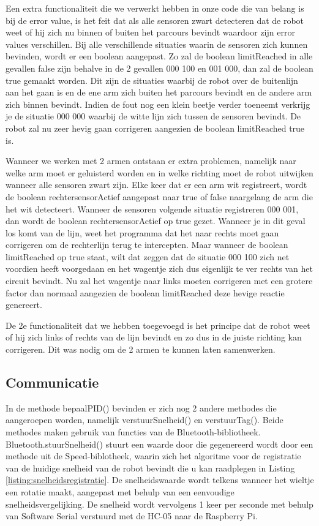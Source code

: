 Een extra functionaliteit die we verwerkt hebben in onze code die van belang is bij de error value, is het feit dat als alle sensoren zwart detecteren dat de robot weet of hij zich nu binnen of buiten het parcours bevindt waardoor zijn error values verschillen. Bij alle verschillende situaties waarin de sensoren zich kunnen bevinden, wordt er een boolean aangepast. Zo zal de boolean limitReached in alle gevallen false zijn behalve in de 2 gevallen 000 100 en 001 000, dan zal de boolean true gemaakt worden. Dit zijn de situaties waarbij de robot over de buitenlijn aan het gaan is en de ene arm zich buiten het parcours bevindt en de andere arm zich binnen bevindt. Indien de fout nog een klein beetje verder toeneemt verkrijg je de situatie 000 000 waarbij de witte lijn zich tussen de sensoren bevindt. De robot zal nu zeer hevig gaan corrigeren aangezien de boolean limitReached true is. 

Wanneer we werken met 2 armen ontstaan er extra problemen, namelijk naar welke arm moet er geluisterd worden en in welke richting moet de robot uitwijken wanneer alle sensoren zwart zijn. Elke keer dat er een arm wit registreert, wordt de boolean rechtersensorActief aangepast naar true of false naargelang de arm die het wit detecteert. Wanneer de sensoren volgende situatie registreren 000 001, dan wordt de boolean rechtersensorActief op true gezet. Wanneer je in dit geval los komt van de lijn, weet het programma dat het naar rechts moet gaan corrigeren om de rechterlijn terug te intercepten. Maar wanneer de boolean limitReached op true staat, wilt dat zeggen dat de situatie 000 100 zich net voordien heeft voorgedaan en het wagentje zich dus eigenlijk te ver rechts van het circuit bevindt. Nu zal het wagentje naar links moeten corrigeren met een grotere factor dan normaal aangezien de boolean limitReached deze hevige reactie genereert.


De 2e functionaliteit dat we hebben toegevoegd is het principe dat de robot weet of hij zich links of rechts van de lijn bevindt en zo dus in de juiste richting kan corrigeren. Dit was nodig om de 2 armen te kunnen laten samenwerken.


\subsection {Communicatie}

In de methode bepaalPID() bevinden er zich nog 2 andere methodes die aangeroepen worden, namelijk verstuurSnelheid() en verstuurTag(). Beide methodes maken gebruik van functies van de Bluetooth-bibliotheek. Bluetooth.stuurSnelheid() stuurt een waarde door die gegenereerd wordt door een methode uit de Speed-biblotheek, waarin zich het algoritme voor de registratie van de huidige snelheid van de robot bevindt die u kan raadplegen in Listing \ref{listing:snelheidsregistratie}. De snelheidswaarde wordt telkens wanneer het wieltje een rotatie maakt, aangepast met behulp van een eenvoudige snelheidsvergelijking. De snelheid wordt vervolgens 1 keer per seconde met behulp van Software Serial verstuurd met de HC-05 naar de Raspberry Pi. 

